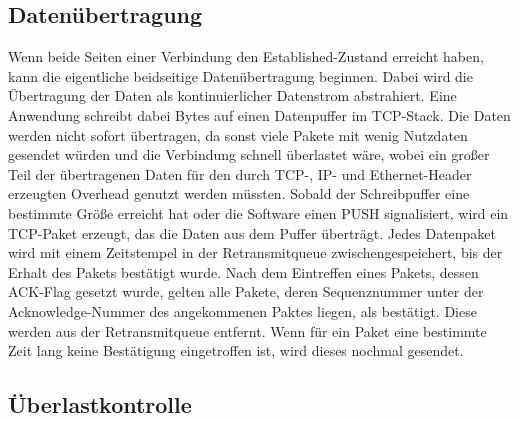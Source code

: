 \subsection{Datenübertragung}

Wenn beide Seiten einer Verbindung den Established-Zustand erreicht haben, kann die eigentliche beidseitige Datenübertragung beginnen. Dabei wird die Übertragung der Daten als kontinuierlicher Datenstrom abstrahiert. Eine Anwendung schreibt dabei Bytes auf einen Datenpuffer im TCP-Stack. Die Daten werden nicht sofort übertragen, da sonst viele Pakete mit wenig Nutzdaten gesendet würden und die Verbindung schnell überlastet wäre, wobei ein großer Teil der übertragenen Daten für den durch TCP-, IP- und Ethernet-Header erzeugten Overhead genutzt werden müssten. Sobald der Schreibpuffer eine bestimmte Größe erreicht hat oder die Software einen PUSH signalisiert, wird ein TCP-Paket erzeugt, das die Daten aus dem Puffer überträgt. Jedes Datenpaket wird mit einem Zeitstempel in der Retransmitqueue zwischengespeichert, bis der Erhalt des Pakets bestätigt wurde. Nach dem Eintreffen eines Pakets, dessen ACK-Flag gesetzt wurde, gelten alle Pakete, deren Sequenznummer unter der Acknowledge-Nummer des angekommenen Paktes liegen, als bestätigt. Diese werden aus der Retransmitqueue entfernt. Wenn für ein Paket eine bestimmte Zeit lang keine Bestätigung eingetroffen ist, wird dieses nochmal gesendet. 

\subsection{Überlastkontrolle}

